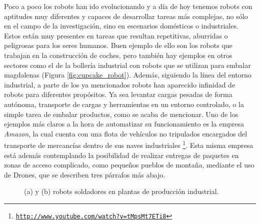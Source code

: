 Poco a poco los robots han ido evolucionando y a día de hoy tenemos robots con aptitudes muy diferentes y capaces de desarrollar tareas más complejas, no sólo en el campo de la investigación, sino en escenarios domésticos o industriales. Estos están muy presentes en tareas que resultan repetitivas, aburridas o peligrosas para los seres humanos. Buen ejemplo de ello son los robots que trabajan en la construcción de coches, pero también hay ejemplos en otros sectores como el de la bollería industrial con robots que se utilizan para embalar magdalenas (Figura \ref{fig:cupcake_robot}). Además, siguiendo la línea del entorno industrial, a parte de los ya mencionados robots han aparecido infinidad de robots para diferentes propósitos. Ya sea levantar cargas pesadas de forma autónoma, transporte de cargas y herramientas en un entorno controlado, o la simple tarea de embalar productos, como se acaba de mencionar. Uno de los ejemplos más claros a la hora de automatizar su funcionamiento es la empresa \textit{Amazon}, la cual cuenta con una flota de vehículos no tripulados encargados del transporte de mercancías dentro de sus naves industriales \footnote{\href{https://www.youtube.com/watch?v=tMpsMt7ETi8}{\texttt{http://www.youtube.com/watch?v=tMpsMt7ETi8}}}. Esta misma empresa está además contemplando la posibilidad de realizar entregas de paquetes en zonas de acceso complicado, como pequeños pueblos de montaña, mediante el uso de Drones, que se describen tres párrafos más abajo.

\begin{figure}
	\begin{center}
		\hspace{0.1cm}
	\end{center}	
	\centering
	\captionsetup{justification=centering,margin=0.1cm}
	\caption{(a) y (b) robots soldadores en plantas de producción industrial.}
	\label{fig:robots2}
\end{figure}

